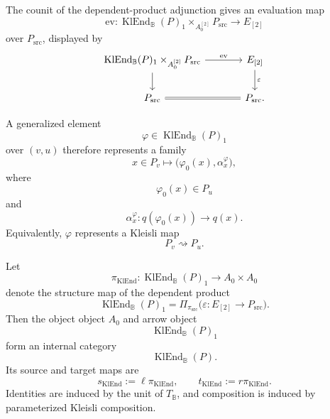 The counit of the dependent-product adjunction gives an evaluation map
\[
    \mathrm{ev}:
    \operatorname{KlEnd}_{\mathbb B}(P)_1
    \times_{A_0^{[2]}}
    P_{\mathrm{src}}
    \to
    E_{[2]}
\]
over \(P_{\mathrm{src}}\), displayed by
\[
\begin{tikzcd}[column sep=large]
    \operatorname{KlEnd}_{\mathbb B}(P)_1
    \times_{A_0^{[2]}}P_{\mathrm{src}}
        \arrow[r, "\mathrm{ev}"]
        \arrow[d]
    &
    E_{[2]}
        \arrow[d, "\varepsilon"]
    \\
    P_{\mathrm{src}}
        \arrow[r, equal]
    &
    P_{\mathrm{src}}.
\end{tikzcd}
\]

A generalized element
\[
    \varphi\in
    \operatorname{KlEnd}_{\mathbb B}(P)_1
\]
over \((v,u)\) therefore represents a family
\[
    x\in P_v
    \longmapsto
    \bigl(
        \varphi_0(x),
        \alpha^\varphi_x
    \bigr),
\]
where
\[
    \varphi_0(x)\in P_u
\]
and
\[
    \alpha^\varphi_x:
    q(\varphi_0(x))\to q(x).
\]
Equivalently, \(\varphi\) represents a Kleisli map
\[
    P_v\rightsquigarrow P_u.
\]

\begin{proposition}
\label{prop:to-internal-klend}
    Let
    \[
        \pi_{\operatorname{KlEnd}}:
        \operatorname{KlEnd}_{\mathbb B}(P)_1
        \to
        A_0\times A_0
    \]
    denote the structure map of the dependent product
    \[
        \operatorname{KlEnd}_{\mathbb B}(P)_1
        =
        \Pi_{\pi_{\mathrm{src}}}
        \bigl(
            \varepsilon:E_{[2]}\to P_{\mathrm{src}}
        \bigr).
    \]
    Then the object object \(A_0\) and arrow object
    \[
        \operatorname{KlEnd}_{\mathbb B}(P)_1
    \]
    form an internal category
    \[
        \operatorname{KlEnd}_{\mathbb B}(P).
    \]
    Its source and target maps are
    \[
        s_{\operatorname{KlEnd}}
        :=
        \ell\pi_{\operatorname{KlEnd}},
        \qquad
        t_{\operatorname{KlEnd}}
        :=
        r\pi_{\operatorname{KlEnd}}.
    \]
    Identities are induced by the unit of \(T_{\mathbb B}\), and composition is
    induced by parameterized Kleisli composition.
\end{proposition}

